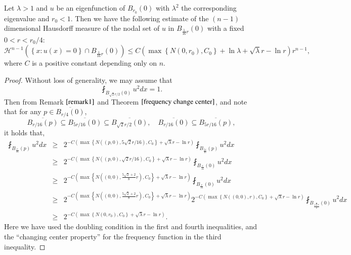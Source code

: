 \documentclass[a4paper, 12pt, onecolumn]{article} \textwidth 148mm
\begin{document}
\begin{theorem}\label{measure estimate of nodal set of the case L=tirangle}
Let $\lambda>1$ and $u$ be an eigenfunction of $B_{r_0}(0)$ with $\lambda^2$ the corresponding eigenvalue and $r_0<1$. Then we have the following estimate of the $(n-1)$ dimensional Hausdorff measure of the nodal set of $u$ in $B_{\frac{1}{16}r}(0)$ with a fixed $0<r<r_0/4$:
\begin{equation}\label{measure estimate of nodal set}
\mathcal{H}^{n-1}\left(\left\{x:u(x)=0\right\}\cap B_{\frac{1}{16}r}(0)\right)
\leq C\left(\max\left\{N(0,r_0),C_0\right\}+\ln\lambda+\sqrt{\lambda}r-\ln r\right)r^{n-1},
\end{equation}
where  $C$ is a positive constant depending only on $n$.
\end{theorem}

\begin{proof}
Without loss of generality, we may assume that
$$
\fint_{B_{\sqrt{2}r/2}(0)}u^2dx=1.
$$
Then from Remark $\ref{remark1}$ and Theorem $\ref{frequency change center}$,
and note that for any $p\in\overline{B_{r/4}(0)}$,
$$\overline{B_{r/16}(p)}\subseteq \overline{B_{5r/16}(0)}\subseteq \overline{B_{\sqrt{2}r/2}(0)},\quad
\overline{B_{r/16}(0)}\subseteq \overline{B_{5r/16}(p)},$$
it holds that,
\begin{eqnarray*}
\fint_{B_{\frac{r}{16}}(p)}u^2dx&\geq&2^{-C\left(\max\left\{N((p,0),5\sqrt{2}r/16),C_0\right\}+\sqrt{\lambda}r-\ln r\right)}
\fint_{B_{\frac{5r}{16}}(p)}u^2dx\\&\geq&2^{-C\left(\max\left\{N((p,0),\sqrt{2}r/16),C_0\right\}+\sqrt{\lambda}r-\ln r\right)}
\fint_{B_{\frac{r}{16}}(0)}u^2dx\\&\geq&2^{-C\left(\max\left\{N((0,0),\frac{5\sqrt{2}+2}{8}r),C_0\right\}
+\sqrt{\lambda}r-\ln r\right)}
\fint_{B_{\frac{r}{16}}(0)}u^2dx\\&\geq&2^{-C\left(\max\left\{N((0,0),\frac{5\sqrt{2}+2}{8}r),C_0\right\}
+\sqrt{\lambda}r-\ln r\right)}2^{-C\left(\max\left\{N((0,0),r),C_0\right\}+\sqrt{\lambda}r-\ln r\right)}\fint_{B_{\frac{\sqrt{2}r}{2}}(0)}u^2dx
\\&\geq&
2^{-C(\max\left\{N(0,r_0),C_0\right\}+\sqrt{\lambda}r-\ln r)}.
\end{eqnarray*}
Here we have used the doubling condition in the first and fourth inequalities, and the ``changing center property'' for the frequency function in the third inequality.


\end{proof}
\end{document}
